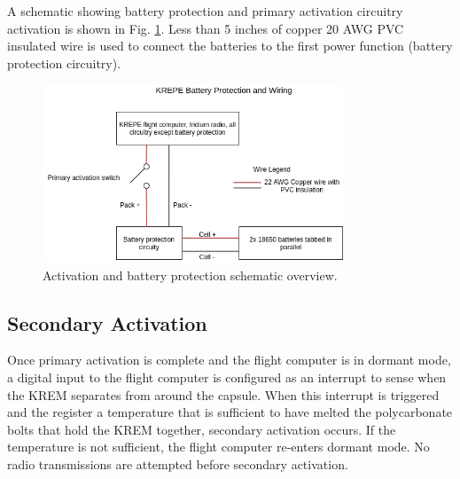 \documentclass{article}
\begin{document}
A schematic showing battery protection and primary activation circuitry activation is shown in Fig. \ref{fig:activation-circuitry}. Less than 5 inches of copper 20 AWG PVC insulated wire is used to connect the batteries to the first power function (battery protection circuitry).




\begin{figure}[H]
    \centering
    \includegraphics[width=0.8\textwidth]{images/krepe-electrical-overview.png}
    \caption{Activation and battery protection schematic overview.}
    \label{fig:activation-circuitry}
\end{figure}







\subsection{Secondary Activation}
\label{sec:secondary-activation}
Once primary activation is complete and the flight computer is in dormant mode, a digital input to the flight computer is configured as an interrupt to sense when the KREM separates from around the capsule. When this interrupt is triggered and the  register a temperature that is sufficient to have melted the polycarbonate bolts that hold the KREM together, secondary activation occurs. If the temperature is not sufficient, the flight computer re-enters dormant mode. No radio transmissions are attempted before secondary activation. 
\end{document}
